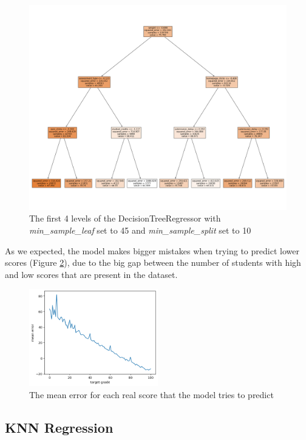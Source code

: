 \documentclass{article}
\begin{document}
\begin{figure}
\centering
\includegraphics[width=1.0\textwidth]{DTstructure.png}
\caption{\label{fig:dtstruct}The first 4 levels of the DecisionTreeRegressor with \textit{min\_sample\_leaf} set to 45 and \textit{min\_sample\_split} set to 10}
\end{figure}

As we expected, the model makes bigger mistakes when trying to predict lower scores (Figure \ref{fig:dtperf}), due to the big gap between the number of students with high and low scores that are present in the dataset. 

\begin{figure}
\centering
\includegraphics[width=0.5\textwidth]{DTnew.png}
\caption{\label{fig:dtperf}The mean error for each real score that the model tries to predict}
\end{figure}

\subsection{KNN Regression}
\end{document}
